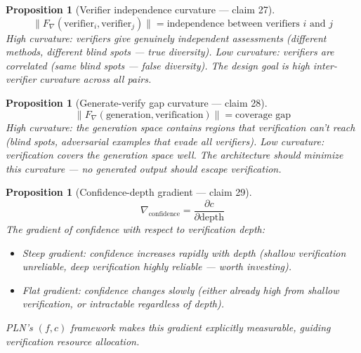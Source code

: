 \documentclass[11pt,a4paper]{article}
\newtheorem{proposition}[definition]{Proposition}
\begin{document}
\begin{proposition}[Verifier independence curvature --- claim 27]
\label{prop:indep_curv}
\[
  \|F_\nabla(\text{verifier}_i, \text{verifier}_j)\| = \text{independence
    between verifiers } i \text{ and } j
\]
High curvature: verifiers give genuinely independent assessments (different
methods, different blind spots --- true diversity). Low curvature:
verifiers are correlated (same blind spots --- false diversity).
The design goal is high inter-verifier curvature across all pairs.
\end{proposition}

\begin{proposition}[Generate-verify gap curvature --- claim 28]
\label{prop:gap_curv}
\[
  \|F_\nabla(\text{generation}, \text{verification})\| = \text{coverage gap}
\]
High curvature: the generation space contains regions that verification
can't reach (blind spots, adversarial examples that evade all verifiers).
Low curvature: verification covers the generation space well. The
architecture should minimize this curvature --- no generated output
should escape verification.
\end{proposition}

\begin{proposition}[Confidence-depth gradient --- claim 29]
\label{prop:conf_grad}
\[
  \nabla_{\text{confidence}} = \frac{\partial c}{\partial \text{depth}}
\]
The gradient of confidence with respect to verification depth:
\begin{itemize}
  \item Steep gradient: confidence increases rapidly with depth (shallow
    verification unreliable, deep verification highly reliable ---
    worth investing).
  \item Flat gradient: confidence changes slowly (either already high
    from shallow verification, or intractable regardless of depth).
\end{itemize}
PLN's $(f, c)$ framework makes this gradient explicitly measurable,
guiding verification resource allocation.
\end{proposition}
\end{document}

